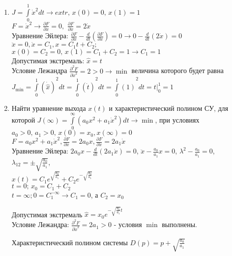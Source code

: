 \documentclass[preprint,russian,a5paper,10pt,twoside,mediummath]{ncc}
\begin{document}
\begin{enumerate}
\item $J=\int\limits_{0}^{1}{{{{\dot{x}}}^{2}}dt\to extr,\,x\left( 0 \right)}=0,\,x\left( 1 \right)=1$
\\$F={{\dot{x}}^{2}}\to \frac{\partial F}{\partial x}=0,\,\,\frac{\partial F}{\partial \dot{x}}=2\dot{x}$
\\Уравнение Эйлера: $\frac{\partial F}{\partial x}-\frac{d}{dt}\left( \frac{\partial F}{\partial \dot{x}} \right)=0\to 0-\frac{d}{dt}\left( 2\dot{x} \right)=0$
\\$\ddot{x}=0,\dot{x}={{C}_{1}},x={{C}_{1}}t+{{C}_{2}};$
\\$x\left( 0 \right)={{C}_{2}}=0,\,x\left( 1 \right)={{C}_{1}}+{{C}_{2}}=1\to {{C}_{1}}=1$
\\Допустимая экстремаль: $\hat{x}=t$
\\Условие Лежандра $\frac{{{\partial }^{2}}F}{\partial {{{\dot{x}}}^{2}}}=2>0\to \min $ величина которого будет равна ${{J}_{\min }}={{\int\limits_{0}^{1}{\left( {\dot{\hat{x}}} \right)}}^{2}}dt={{\int\limits_{0}^{1}{\left( {\dot{t}} \right)}}^{2}}dt={{\int\limits_{0}^{1}{\left( 1 \right)}}^{2}}dt=\left. t \right|_{0}^{1}=1$
\item Найти уравнение выхода $x\left( t \right)$  и характеристический полином СУ, для которой $J\left( \infty  \right)=\int\limits_{0}^{\infty }{\left( {{a}_{0}}{{x}^{2}}+{{a}_{1}}{{{\dot{x}}}^{2}} \right)}dt\to \min$, при условиях ${{a}_{0}}>0,\,{{a}_{1}}>0,\,x\left( 0 \right)={{x}_{0}},x\left( \infty  \right)=0$
\\$F={{a}_{0}}{{x}^{2}}+{{a}_{1}}{{\dot{x}}^{2}},\frac{\partial F}{\partial x}=2{{a}_{0}}x,\frac{\partial F}{\partial \dot{x}}=2{{a}_{1}}\dot{x}$
\\Уравнение Эйлера: $2{{a}_{0}}x-\frac{d}{dt}\left( 2{{a}_{1}}\dot{x} \right)=0$, $\ddot{x}-\frac{{{a}_{0}}}{{{a}_{1}}}x=0$, ${{\lambda }^{2}}-\frac{{{a}_{0}}}{{{a}_{1}}}=0$, ${{\lambda }_{12}}=\pm \sqrt{\frac{{{a}_{0}}}{{{a}_{1}}}}$, 
\\$x\left( t \right)={{C}_{1}}{{e}^{\sqrt{\frac{{{a}_{0}}}{{{a}_{1}}}}}}+{{C}_{2}}{{e}^{-\sqrt{\frac{{{a}_{0}}}{{{a}_{1}}}}}}$
\\$t=0;\,{{x}_{0}}={{C}_{1}}+{{C}_{2}}$
\\$t=\infty ;0=C_{1}^{-\infty }\to {{C}_{1}}=0$, а ${{C}_{2}}={{x}_{0}}$
\par Допустимая экстремаль $\hat{x}={{x}_{0}}{{e}^{-\sqrt{\frac{{{a}_{0}}}{{{a}_{1}}}}t}}$
\\Условие Лежандра: $\frac{{{\partial }^{2}}F}{\partial {{{\dot{x}}}^{2}}}=2{{a}_{1}}>0$ - условия $\min $ выполнены.
\par Характеристический полином системы $D\left( p \right)=p+\sqrt{\frac{{{a}_{0}}}{{{a}_{1}}}}$ 
\end{enumerate}
\end{document}
